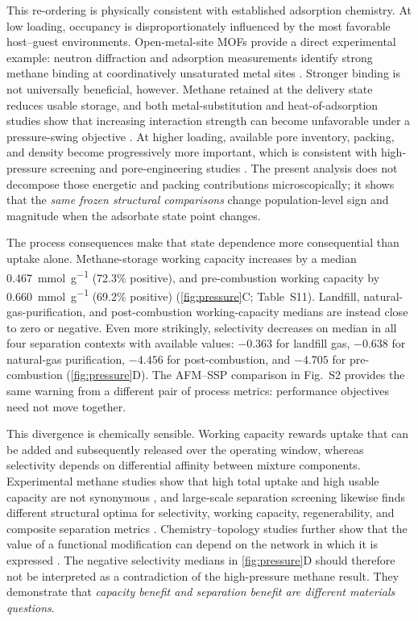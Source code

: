 \documentclass[11pt,a4paper]{article}
\newcommand{\SIfig}[1]{Fig.~S#1}
\newcommand{\SItab}[1]{Table~S#1}
\begin{document}
This re-ordering is physically consistent with established adsorption chemistry.
At low loading, occupancy is disproportionately influenced by the most favorable
host--guest environments. Open-metal-site MOFs provide a direct experimental
example: neutron diffraction and adsorption measurements identify strong methane
binding at coordinatively unsaturated metal sites \cite{wu2009opensites}. Stronger
binding is not universally beneficial, however. Methane retained at the delivery
state reduces usable storage, and both metal-substitution and heat-of-adsorption
studies show that increasing interaction strength can become unfavorable under a
pressure-swing objective \cite{rana2014metal,lee2014doe}. At higher loading,
available pore inventory, packing, and density become progressively more important,
which is consistent with high-pressure screening and pore-engineering studies
\cite{gomezgualdron2014limits,liang2017poregeometry,
song2026poreengineering,getman2012simreview}. The present analysis does not decompose those
energetic and packing contributions microscopically; it shows that the \emph{same
frozen structural comparisons} change population-level sign and magnitude when the
adsorbate state point changes.

The process consequences make that state dependence more consequential than uptake
alone. Methane-storage working capacity increases by a median
\SI{0.467}{\milli\mole\per\gram} (72.3\% positive), and pre-combustion working
capacity by \SI{0.660}{\milli\mole\per\gram} (69.2\% positive)
(\cref{fig:pressure}C; \SItab{11}). Landfill, natural-gas-purification, and
post-combustion working-capacity medians are instead close to zero or negative.
Even more strikingly, selectivity decreases on median in all four separation
contexts with available values: $-0.363$ for landfill gas, $-0.638$ for
natural-gas purification, $-4.456$ for post-combustion, and $-4.705$ for
pre-combustion (\cref{fig:pressure}D). The AFM--SSP comparison in \SIfig{2}
provides the same warning from a different pair of process metrics: performance
objectives need not move together.

This divergence is chemically sensible. Working capacity rewards uptake that can
be added and subsequently released over the operating window, whereas selectivity
depends on differential affinity between mixture components. Experimental methane
studies show that high total uptake and high usable capacity are not synonymous
\cite{gandara2014al,li2014dynamic}, and large-scale separation screening likewise
finds different structural optima for selectivity, working capacity,
regenerability, and composite separation metrics \cite{altintas2018co2database}.
Chemistry--topology studies further show that the value of a functional
modification can depend on the network in which it is expressed
\cite{anderson2018poretopology}. The negative selectivity medians in
\cref{fig:pressure}D should therefore not be interpreted as a contradiction of the
high-pressure methane result. They demonstrate that \emph{capacity benefit and
separation benefit are different materials questions}.
\end{document}
